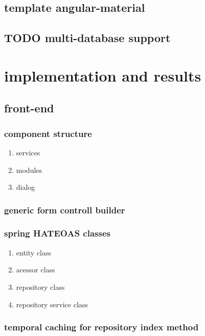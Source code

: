 \documentclass[11pt]{article}
\begin{document}
\subsection{template angular-material}
\label{sec:org044ef5d}
\subsection{{\bfseries\sffamily TODO} multi-database support}
\label{sec:org3f1ee7f}
\section{implementation and results}
\label{sec:org8e6e780}
\subsection{front-end}
\label{sec:orga9b61d1}
\subsubsection{component structure}
\label{sec:orgac54bff}
\begin{enumerate}
\item services
\label{sec:org90b3f74}
\item modules
\label{sec:org6020710}
\item dialog
\label{sec:orgccfd5bb}
\end{enumerate}
\subsubsection{generic form controll builder}
\label{sec:org864c09d}
\subsubsection{spring HATEOAS classes}
\label{sec:org1820483}
\begin{enumerate}
\item entity class
\label{sec:org6acae8c}
\item acessor class
\label{sec:org8eb0dcd}
\item repository class
\label{sec:orgb913c7d}
\item repository service class
\label{sec:org84e9caf}
\end{enumerate}
\subsubsection{temporal caching for repository index method}
\label{sec:org0f353a9}
\end{document}
